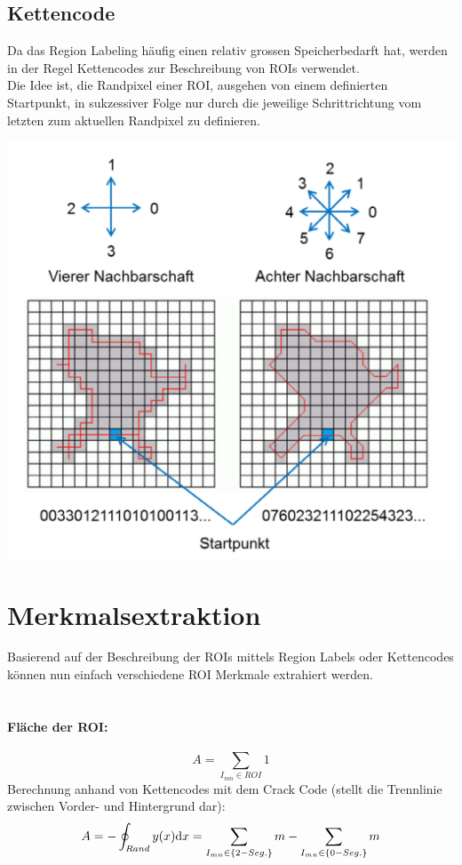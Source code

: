 \subsection{Kettencode}
Da das Region Labeling häufig einen relativ grossen Speicherbedarft hat, werden in der Regel Kettencodes zur Beschreibung von ROIs verwendet.\\
Die Idee ist, die Randpixel einer ROI, 
ausgehen von einem definierten Startpunkt, 
in sukzessiver Folge nur durch die jeweilige Schrittrichtung vom letzten zum aktuellen Randpixel zu definieren.
\begin{center}
	\includegraphics[scale=.5]{../fig/kettencode.png}
\end{center}

\section{Merkmalsextraktion}
Basierend auf der Beschreibung der ROIs mittels Region Labels oder Kettencodes können nun einfach verschiedene ROI Merkmale extrahiert werden.\\
\\
\paragraph{Fläche der ROI:}
\[
	A = \sum_{I_{mn} \in ROI}1
\]
Berechnung anhand von Kettencodes mit dem Crack Code (stellt die Trennlinie zwischen Vorder- und Hintergrund dar):
\[
	A = -\oint_{Rand}y(x)\mathrm{d} x = \sum_{I_{mn} \in \{2-Seg.\}}m - \sum_{I_{mn} \in \{0-Seg.\}}m 
\]
~\\\\
